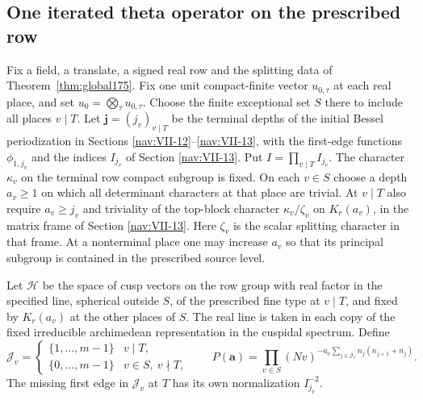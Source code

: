 \documentclass[a4paper,11pt]{article}
\theoremstyle{definition}
\theoremstyle{remark}
\numberwithin{equation}{section}
\begin{document}
\subsection{One iterated theta operator on the prescribed row}\label{nav:VIII-07}
\label{sec:common177}

Fix a field, a translate, a signed real row and the splitting
data of Theorem~\ref{thm:global175}. Fix one unit compact-finite
vector \(u_{0,\tau}\) at each real place, and set
\(u_0=\bigotimes_\tau u_{0,\tau}\). Choose the finite exceptional
set \(S\) there to include all places \(v\mid T\). Let
\(\mathbf j=(j_v)_{v\mid T}\) be the terminal depths of the
initial Bessel periodization in Sections \ref{nav:VII-12}--\ref{nav:VII-13}, with
the first-edge functions \(\phi_{1,j_v}\) and the indices
\(I_{j_v}\) of Section \ref{nav:VII-13}. Put \(I=\prod_{v\mid T}I_{j_v}\).
The character \(\kappa_v\) on the terminal row compact
subgroup is fixed. On each \(v\in S\) choose a depth
\(a_v\ge1\) on which all determinant characters at that
place are trivial. At \(v\mid T\) also require \(a_v\ge j_v\)
and triviality of the top-block character
\(\kappa_v/\zeta_v\) on \(K_r(a_v)\), in the matrix frame
of Section \ref{nav:VII-13}. Here \(\zeta_v\) is the scalar splitting
character in that frame. At a nonterminal place one may increase \(a_v\) so that
its principal subgroup is contained in the prescribed source level.

Let \(\mathcal H\) be the space of cusp vectors on the row
group with real factor in the specified line, spherical
outside \(S\), of the prescribed fine type at \(v\mid T\),
and fixed by \(K_r(a_v)\) at the other places of \(S\).
The real line is taken in each copy of the fixed irreducible
archimedean representation in the cuspidal spectrum.
Define
\[
 \mathcal J_v=
 \begin{cases}
    \{1,\dots,m-1\} & v\mid T,\\
    \{0,\dots,m-1\} & v\in S,\ v\nmid T ,
 \end{cases}
 \qquad
 P(\mathbf a)=\prod_{v\in S}(Nv)^{
       -a_v\sum_{j\in\mathcal J_v}n_j(n_{j+1}+n_j)} .
\]
The missing first edge in \(\mathcal J_v\) at \(T\) has its
own normalization \(I_{j_v}^{-2}\).
\end{document}
